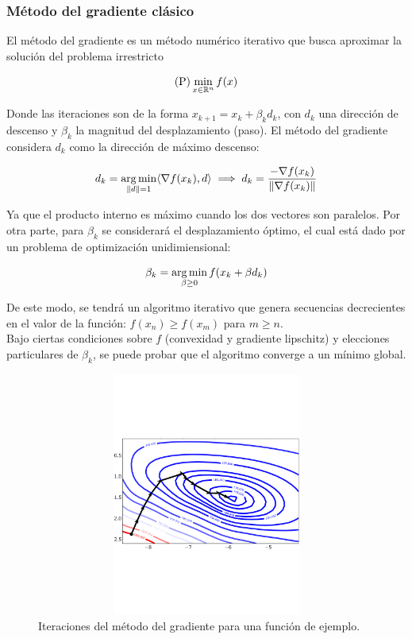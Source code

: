 \subsubsection{Método del gradiente clásico}

El método del gradiente es un método numérico iterativo que busca aproximar la solución del problema irrestricto

\begin{equation}
	\text{(P)} \min_{x\in \mathbb{R}^n} f(x)
\end{equation}

Donde las iteraciones son de la forma $x_{k+1} = x_k + \beta_k d_k$, con $d_k$ una dirección de descenso y $\beta_k$ la magnitud del desplazamiento (paso). El método del gradiente considera $d_k$ como la dirección de máximo descenso:

\begin{equation}
	d_k = \operatorname*{arg\,min}_{\left\lVert d\right\rVert = 1} \langle\nabla f(x_k),d\rangle \implies d_k = \frac{-\nabla f(x_k)}{\left\lVert\nabla f(x_k)\right\rVert}
\end{equation}

Ya que el producto interno es máximo cuando los dos vectores son paralelos. Por otra parte, para $\beta_k$ se considerará el desplazamiento óptimo, el cual está dado por un problema de optimización unidimiensional:

\begin{equation}
	\beta_k = \operatorname*{arg\,min}_{\beta\geq 0} f(x_k + \beta d_k) 
\end{equation}

De este modo, se tendrá un algoritmo iterativo que genera secuencias decrecientes en el valor de la función: $f(x_n)\geq f(x_m)$ para $m\geq n$.\\

Bajo ciertas condiciones sobre $f$ (convexidad y gradiente lipschitz) y elecciones particulares de $\beta_k$, se puede probar que el algoritmo converge a un mínimo global. \\

\begin{figure}[h]
  \centering
  \includegraphics[width=12cm, height=8cm]{img/anexos_gd.pdf}
  \caption{Iteraciones del método del gradiente para una función de ejemplo.}
\end{figure}

